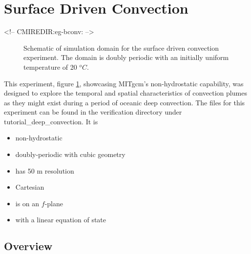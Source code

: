 \section{Surface Driven Convection}
\label{www:tutorials}
\label{sect:eg-bconv}
\begin{rawhtml}
<!-- CMIREDIR:eg-bconv: -->
\end{rawhtml}


%
%

\begin{figure}
\begin{center}
\end{center}
\caption{Schematic of simulation domain 
for the surface driven convection experiment. The domain is doubly periodic
with an initially uniform temperature of 20 $^oC$. 
}
\label{FIG:eg-bconv-simulation_config}
\end{figure}

This experiment, figure \ref{FIG:eg-bconv-simulation_config}, showcasing MITgcm's non-hydrostatic 
capability, was designed to explore 
the temporal and spatial characteristics of convection plumes as they might exist during a 
period of oceanic deep convection. The files for this experiment can be found in the verification
directory under tutorial\_deep\_convection. It is

\begin{itemize}
\item non-hydrostatic 
\item doubly-periodic with cubic geometry
\item has 50 m resolution 
\item Cartesian  
\item is on an $f$-plane 
\item with a linear equation of state 
\end{itemize}

\subsection{Overview}
\label{www:tutorials}

